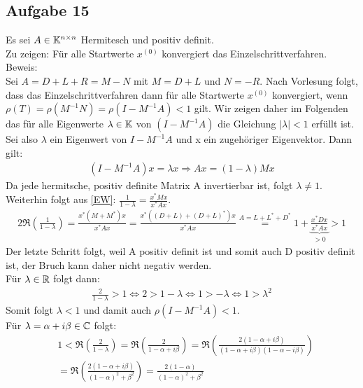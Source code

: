 \subsection*{Aufgabe 15}
Es sei $A \in \mathbb K^{n\times n}$ Hermitesch und positiv definit.\\
Zu zeigen: Für alle Startwerte $x^{(0)}$ konvergiert das Einzelschrittverfahren.\\
\newline
Beweis:\\
Sei $A=D+L+R=M-N$ mit $M=D+L$ und $N=-R$.
Nach Vorlesung folgt, dass das Einzelschrittverfahren dann für alle Startwerte $x^{(0)}$ konvergiert, wenn $\rho(T)=\rho(M^{-1}N) =\rho(I-M^{-1}A)<1$ gilt. Wir zeigen daher im Folgenden das für alle Eigenwerte $\lambda \in \mathbb K$ von $(I-M^{-1}A)$ die Gleichung $|\lambda|<1$ erfüllt ist.\\
\newline
Sei also $\lambda$ ein Eigenwert von $I-M^{-1}A$ und x ein zugehöriger Eigenvektor. Dann gilt:
\begin{align}\label{EW}
(I-M^{-1}A)x=\lambda x \Rightarrow Ax=(1-\lambda)Mx
\end{align}
Da jede hermitsche, positiv definite Matrix A invertierbar ist, folgt $\lambda \neq 1$.\\
Weiterhin folgt aus \eqref{EW}: $\frac{1}{1-\lambda}=\frac{x^*Mx}{x^*Ax}$.
\begin{align}
2\Re\left(\frac{1}{1-\lambda}\right)=\frac{x^*(M+M^*)x}{x^*Ax}=\frac{x^*((D+L)+(D+L)^*)x}{x^*Ax}\overset{A=L+L^*+D^*}{=}1+\underbrace{\frac{x^*Dx}{x^*Ax}}_{>0}>1
\end{align}
Der letzte Schritt folgt, weil A positiv definit ist und somit auch D positiv definit ist, der Bruch kann daher nicht negativ werden.\\
\newline
Für $\lambda \in \mathbb R$ folgt dann:
\begin{align*}
\frac{2}{1-\lambda}>1\Leftrightarrow  2>1-\lambda
\Leftrightarrow 1>-\lambda \Leftrightarrow 1>\lambda^2
\end{align*}
Somit folgt $\lambda<1$ und damit auch $\rho(I-M^{-1}A)<1$.\\
\newline
Für $\lambda=\alpha +i\beta \in \mathbb C$ folgt:
\begin{align*}
&1<\Re\left(\frac{2}{1-\lambda}\right)=\Re\left(\frac{2}{1-\alpha+ i \beta}\right)=\Re\left(\frac{2(1-\alpha+i \beta)}{(1-\alpha+ i \beta)(1-\alpha- i \beta)}\right)\\&=\Re\left(\frac{2(1-\alpha+i \beta)}{(1-\alpha)^2+\beta^2}\right)=\frac{2(1-\alpha)}{(1-\alpha)^2+\beta^2}
\end{align*}
